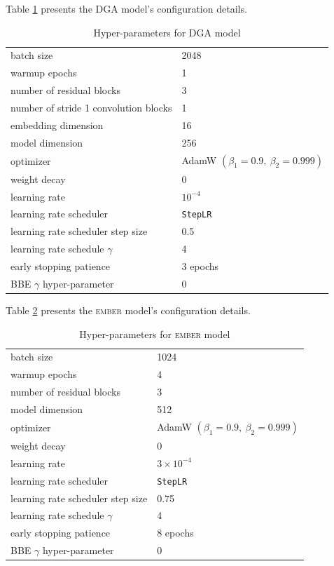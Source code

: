 \documentclass[conference]{IEEEtran}
\begin{document}
    Table \ref{tab:dga-hyper} presents the DGA model's configuration details. 

    \begin{table}
    \caption{Hyper-parameters for DGA model}
    \label{tab:dga-hyper}
        \begin{tabular}{l | l }
            batch size & 2048 \\
            warmup epochs & 1 \\
            number of residual blocks & 3 \\
            number of stride 1 convolution blocks & 1 \\
            embedding dimension & 16 \\
            model dimension & 256 \\
            optimizer & AdamW $(\beta_1 = 0.9,~\beta_2 = 0.999)$ \\
            weight decay & 0 \\
            learning rate & $10^{-4}$ \\
            learning rate scheduler & \texttt{StepLR} \\
            learning rate scheduler step size & 0.5 \\
            learning rate schedule $\gamma$ & 4 \\
            early stopping patience & 3 epochs \\
            BBE $\gamma$ hyper-parameter & 0
        \end{tabular}
    \end{table}

    Table \ref{tab:ember-hyper} presents the \textsc{ember} model's configuration details.

    \begin{table}
    \caption{Hyper-parameters for \textsc{ember} model}
    \label{tab:ember-hyper}
        \begin{tabular}{l | l }
            batch size & 1024 \\
            warmup epochs & 4 \\
            number of residual blocks & 3 \\
            model dimension & 512 \\
            optimizer & AdamW $(\beta_1 = 0.9,~\beta_2 = 0.999)$ \\
            weight decay & 0 \\   
            learning rate & $3 \times 10^{-4}$ \\
            learning rate scheduler & \texttt{StepLR} \\
            learning rate scheduler step size & 0.75 \\
            learning rate schedule $\gamma$ & 4 \\
            early stopping patience & 8 epochs \\
            BBE $\gamma$ hyper-parameter & 0
        \end{tabular}
    \end{table}
\end{document}
